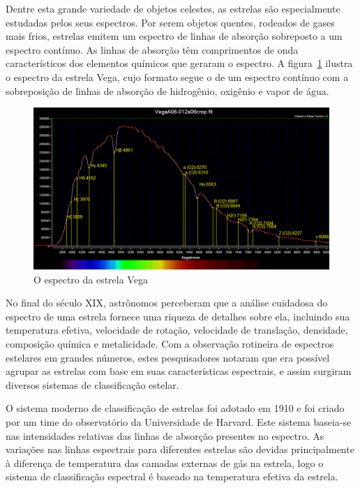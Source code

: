 Dentre esta grande variedade de objetos celestes, as estrelas são especialmente estudadas pelos seus espectros. Por serem objetos quentes, rodeados de gases mais frios, estrelas emitem um espectro de linhas de absorção sobreposto a um espectro contínuo. As linhas de absorção têm comprimentos de onda característicos dos elementos químicos que geraram o espectro. A figura~\ref{fig:vega-spectrum} ilustra o espectro da estrela Vega, cujo formato segue o de um espectro contínuo com a sobreposição de linhas de absorção de hidrogênio, oxigênio e vapor de água.

\begin{figure}[htb]
\centering
\includegraphics[width=12cm]{figuras/vega_spectrum.jpg}
\caption{O espectro da estrela Vega\citep{vega-spectrum}}
\label{fig:vega-spectrum}
\end{figure}

No final do século XIX, astrônomos perceberam que a análise cuidadosa do espectro de uma estrela fornece uma riqueza de detalhes sobre ela, incluindo sua temperatura efetiva, velocidade de rotação, velocidade de translação, densidade, composição química e metalicidade. Com a observação rotineira de espectros estelares em grandes números, estes pesquisadores notaram que era possível agrupar as estrelas com base em suas características espectrais, e assim surgiram diversos sistemas de classificação estelar. 

O sistema moderno de classificação de estrelas foi adotado em 1910 e foi criado por um time do observatório da Universidade de Harvard. Este sistema baseia-se nas intensidades relativas das linhas de absorção presentes no espectro. As variações nas linhas espectrais para diferentes estrelas são devidas principalmente à diferença de temperatura das camadas externas de gás na estrela, logo o sistema de classificação espectral é baseado na temperatura efetiva da estrela. 

